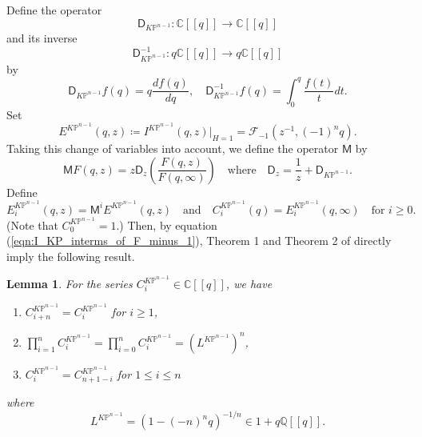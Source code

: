 \documentclass[12pt]{amsart}
\newtheorem{lem}[prop]{Lemma}
\numberwithin{equation}{section}
\newcommand{\KP}{K\mathbb{P}}
\begin{document}
Define the operator $$\mathsf{D}_{K\mathbb{P}^{n-1}}:\mathbb{C}[\![q]\!]\rightarrow \mathbb{C}[\![q]\!]$$ and its inverse $$\mathsf{D}_{K\mathbb{P}^{n-1}}^{-1}:q\mathbb{C}[\![q]\!]\rightarrow q\mathbb{C}[\![q]\!]$$ by
\begin{equation*}
\mathsf{D}_{K\mathbb{P}^{n-1}}f(q)=q\frac{df(q)}{dq}, \quad \mathsf{D}_{K\mathbb{P}^{n-1}}^{-1}f(q)=\int_{0}^q\frac{f(t)}{t}dt.
\end{equation*}
Set
\begin{equation*}
E^{\KP^{n-1}}(q,z)\coloneqq I^{K\mathbb{P}^{n-1}}(q,z)\big\vert_{H=1}=\mathcal{F}_{-1}\left(z^{-1},(-1)^nq\right).
\end{equation*}
Taking this change of variables into account, we define the operator $\mathsf{M}$ by
\begin{equation}\label{eqn:defnM}
\mathsf{M}F(q,z)=z\mathsf{D}_z\left(\frac{F(q,z)}{F(q,\infty)}\right)\quad\text{where}\quad \mathsf{D}_z=\frac{1}{z}+\mathsf{D}_{K\mathbb{P}^{n-1}}.
\end{equation}
Define
\begin{equation}\label{eqn:defnEC}
E_i^{\KP^{n-1}}(q,z)=\mathsf{M}^iE^{\KP^{n-1}}(q,z)\quad\text{and}\quad C^{\KP^{n-1}}_i(q)=E_i^{\KP^{n-1}}(q,\infty)\quad\text{for }i\geq{0}.
\end{equation}
(Note that $C^{\KP^{n-1}}_0=1$.) Then, by equation (\ref{eqn:I_KP_interms_of_F_minus_1}), Theorem 1  and Theorem 2 of \cite{zz} directly imply the following result.

\begin{lem}\label{lem:properties_of_C_functions}
For the series $C^{\KP^{n-1}}_i\in\mathbb{C}[\![q]\!]$, we have
\begin{enumerate}
    \item $C^{\KP^{n-1}}_{i+n}=C^{\KP^{n-1}}_i$ for $i\geq{1}$,
    \item $\prod_{i=1}^nC^{\KP^{n-1}}_i=\prod_{i=0}^nC^{\KP^{n-1}}_i=(L^{\KP^{n-1}})^n$,
    \item $C^{\KP^{n-1}}_i=C^{\KP^{n-1}}_{n+1-i}$ for $1\leq{i}\leq{n}$
\end{enumerate}
where $$L^{\KP^{n-1}}=(1-(-n)^nq)^{-1/n}\in 1+q\mathbb{Q}[\![q]\!].$$
\end{lem}
\end{document}
